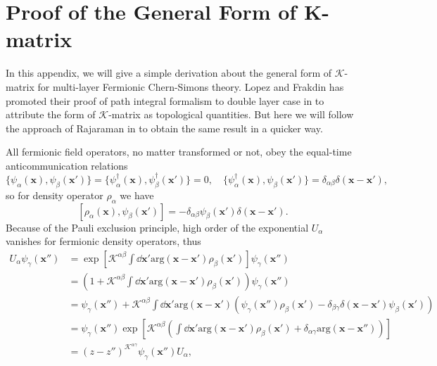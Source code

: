 \documentclass[bachelor,english,numbers]{ustcthesis}
\begin{document}
\chapter{Proof of the General Form of K-matrix}
	In this appendix, we will give a simple derivation about the general form of $\mathcal{K}$-matrix for multi-layer Fermionic Chern-Simons theory. Lopez and Frakdin has promoted their proof of path integral formalism to double layer case in \cite{lopez1995fermionic} to attribute the form of $\mathcal{K}$-matrix as topological quantities. But here we will follow the approach of Rajaraman in \cite{rajaraman1997generalized} to obtain the same result in a quicker way.\par
	All fermionic field operators, no matter transformed or not, obey the equal-time anticommunication relations
	\begin{equation*}
		\{\psi_\alpha(\bm{x}),\psi_\beta(\bm{x'})\}=\{\psi_\alpha^\dagger(\bm{x}),\psi_\beta^\dagger(\bm{x'})\}=0,\quad\{\psi_\alpha^\dagger(\bm{x}),\psi_\beta(\bm{x'})\}=\delta_{\alpha \beta}\delta(\bm{x}-\bm{x'}),
	\end{equation*}
	so for density operator $\rho_\alpha$ we have
	\begin{equation}\label{A.1.1}
		[\rho_\alpha(\bm{x}),\psi_\beta(\bm{x'})]=-\delta_{\alpha \beta}\psi_\beta(\bm{x'})\delta(\bm{x}-\bm{x'}).
	\end{equation}
	Because of the Pauli exclusion principle, high order of the exponential $U_\alpha$ vanishes for fermionic density operators, thus 
	\begin{align}
		U_\alpha\psi_\gamma(\bm{x''})&=\exp\left[\mathcal{K}^{\alpha \beta}\int\dd\bm{x'}\mathrm{arg}(\bm{x}-\bm{x'})\rho_\beta(\bm{x'})\right]\psi_\gamma(\bm{x''})\nonumber\\
		&=\left(1+\mathcal{K}^{\alpha \beta}\int\dd\bm{x'}\mathrm{arg}(\bm{x}-\bm{x'})\rho_\beta(\bm{x'})\right)\psi_\gamma(\bm{x''})\nonumber\\
		&=\psi_\gamma(\bm{x''})+\mathcal{K}^{\alpha \beta}\int\dd\bm{x'}\mathrm{arg}(\bm{x}-\bm{x'})\left(\psi_\gamma(\bm{x''})\rho_\beta(\bm{x'})-\delta_{\beta \gamma}\delta(\bm{x}-\bm{x'})\psi_\beta(\bm{x'})\right)\nonumber\\
		&=\psi_\gamma(\bm{x''})\exp\left[\mathcal{K}^{\alpha \beta}\left(\int\dd\bm{x'}\mathrm{arg}(\bm{x}-\bm{x'})\rho_\beta(\bm{x'})+\delta_{\alpha \gamma}\mathrm{arg}(\bm{x}-\bm{x''})\right)\right]\nonumber\\
		&=(z-z'')^{\mathcal{K}^{\alpha \gamma}}\psi_\gamma(\bm{x''})U_\alpha,\label{A.1.2}
	\end{align}
\end{document}
